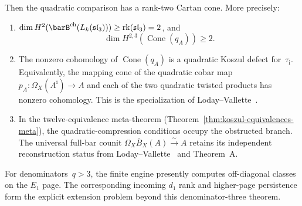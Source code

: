 \begin{theorem}
Then the quadratic comparison has a rank-two Cartan cone.  More
precisely:
\begin{enumerate}[label=\textup{(\roman*)}]
\item $\dim H^2(\barB^{\mathrm{ch}}(L_k(\mathfrak{sl}_3)))
 \geq \mathrm{rk}(\mathfrak{sl}_3) = 2$, and
 \[
 \dim H^{2,3}\!\left(\operatorname{Cone}(q_A)\right)\geq2.
 \]
\item The nonzero cohomology of $\operatorname{Cone}(q_A)$ is a
 quadratic Koszul defect for~$\tau_{\mathrm i}$.  Equivalently, the
 mapping cone of the quadratic cobar map
 $p_A\colon\Omega_X(A^{\mathrm i})\to A$ and each of the two
 quadratic twisted products has nonzero cohomology.  This is the
 specialization of
 Loday--Vallette~\cite[Theorem~2.3.2 and Theorem~3.4.6]{LV12}.
\item In the twelve-equivalence meta-theorem
 \textup{(}Theorem~\ref{thm:koszul-equivalences-meta}\textup{)},
 the quadratic-compression conditions occupy the obstructed branch.
 The universal full-bar counit
 $\Omega_X\bar B_X(A)\xrightarrow{\sim}A$ retains its independent
 reconstruction status from
 Loday--Vallette~\cite[Corollary~2.3.4]{LV12} and Theorem~A.
\end{enumerate}
For denominators~$q>3$, the finite engine presently computes
off-diagonal classes on the $E_1$ page.  The corresponding incoming
$d_1$ rank and higher-page persistence form the explicit extension
problem beyond this denominator-three theorem.
\end{theorem}

